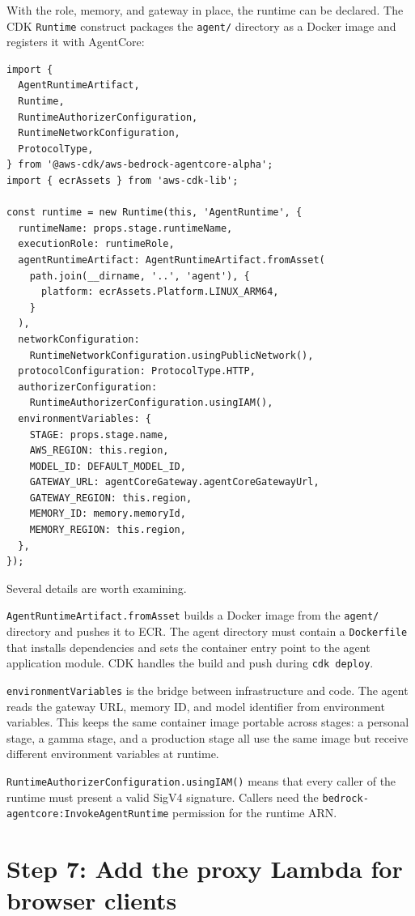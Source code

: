 With the role, memory, and gateway in place, the runtime can be declared. The CDK
\texttt{Runtime} construct packages the \texttt{agent/} directory as a Docker image and
registers it with AgentCore:

\begin{lstlisting}
import {
  AgentRuntimeArtifact,
  Runtime,
  RuntimeAuthorizerConfiguration,
  RuntimeNetworkConfiguration,
  ProtocolType,
} from '@aws-cdk/aws-bedrock-agentcore-alpha';
import { ecrAssets } from 'aws-cdk-lib';

const runtime = new Runtime(this, 'AgentRuntime', {
  runtimeName: props.stage.runtimeName,
  executionRole: runtimeRole,
  agentRuntimeArtifact: AgentRuntimeArtifact.fromAsset(
    path.join(__dirname, '..', 'agent'), {
      platform: ecrAssets.Platform.LINUX_ARM64,
    }
  ),
  networkConfiguration:
    RuntimeNetworkConfiguration.usingPublicNetwork(),
  protocolConfiguration: ProtocolType.HTTP,
  authorizerConfiguration:
    RuntimeAuthorizerConfiguration.usingIAM(),
  environmentVariables: {
    STAGE: props.stage.name,
    AWS_REGION: this.region,
    MODEL_ID: DEFAULT_MODEL_ID,
    GATEWAY_URL: agentCoreGateway.agentCoreGatewayUrl,
    GATEWAY_REGION: this.region,
    MEMORY_ID: memory.memoryId,
    MEMORY_REGION: this.region,
  },
});
\end{lstlisting}

Several details are worth examining.

\texttt{AgentRuntimeArtifact.fromAsset} builds a Docker image from the \texttt{agent/}
directory and pushes it to ECR. The agent directory must contain a \texttt{Dockerfile}
that installs dependencies and sets the container entry point to the agent application
module. CDK handles the build and push during \texttt{cdk deploy}.

\texttt{environmentVariables} is the bridge between infrastructure and code. The agent
reads the gateway URL, memory ID, and model identifier from environment variables. This
keeps the same container image portable across stages: a personal stage, a gamma stage,
and a production stage all use the same image but receive different environment variables
at runtime.

\texttt{RuntimeAuthorizerConfiguration.usingIAM()} means that every caller of the
runtime must present a valid SigV4 signature. Callers need the
\texttt{bedrock-agentcore:InvokeAgentRuntime} permission for the runtime ARN.

\section{Step 7: Add the proxy Lambda for browser clients}

